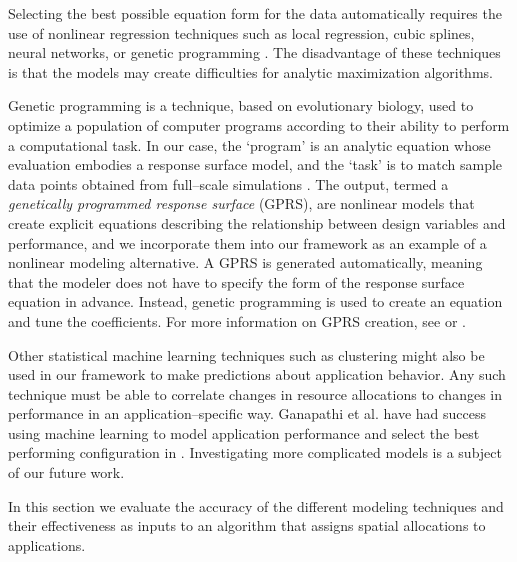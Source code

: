 Selecting the best possible equation form for the data automatically requires the use of nonlinear regression techniques such as local regression, cubic splines, neural networks, or genetic programming \cite{alvarez-thesis, bodik-acdc09, wasserman-book}.  The disadvantage of these techniques is that the models may create difficulties for analytic maximization algorithms. 

Genetic programming is a technique, based on evolutionary biology, used to optimize a population of computer programs according to their ability to perform a computational task. In our case, the `program' is an analytic equation whose evaluation embodies a response surface model, and the `task' is to match sample data points obtained from full--scale simulations \cite{alvarez-thesis}. The output, termed a
{\em genetically programmed response surface} (GPRS), are nonlinear models that create explicit equations describing the relationship between design variables and performance, and we incorporate them into our framework as an example of a nonlinear modeling alternative.
A GPRS is generated automatically, meaning that the modeler does not have to specify the form of the response surface equation in advance. Instead, genetic programming \cite{koza} is used to create an equation and tune the coefficients.  For more information on GPRS creation, see \cite{alvarez-thesis} or \cite{cook-dac08}.

Other statistical machine learning techniques such as clustering might also be used in our framework to make predictions about application behavior.  Any such technique must be able to correlate changes in resource allocations to changes in performance in an application--specific way.  Ganapathi et al. have had success using machine learning to model application performance and select the best performing configuration in \cite{Archana}. Investigating more complicated models is a subject of our future work.


In this section we evaluate the accuracy of the different modeling techniques and their effectiveness as inputs to an algorithm that assigns spatial allocations to applications.

